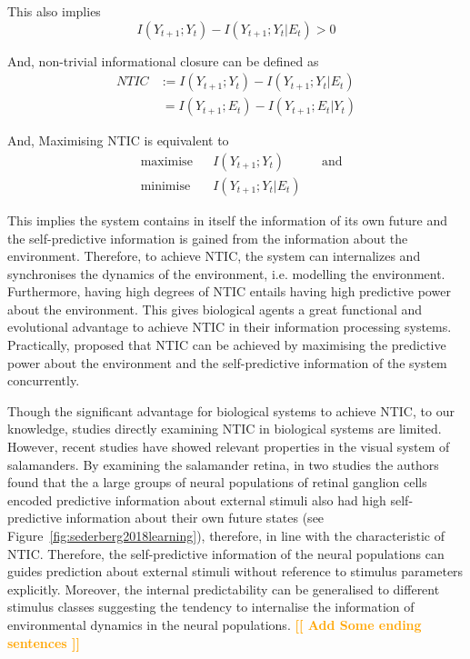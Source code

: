 \documentclass[utf8]{article}
\newcommand{\toWrite}[1]{\noindent
			\textcolor{Orange}{\textbf{[[ #1 ]]}}}
\begin{document}
			\noindent
			This also implies
				\begin{equation}
					I(Y_{t+1};Y_{t})-I(Y_{t+1};Y_{t}|E_{t}) > 0
				\end{equation}



			\noindent
			And, non-trivial informational closure can be defined as
				\begin{equation}
				\left.\begin{array}
				{rl}{NTIC} & {:=I(Y_{t+1};Y_{t})-I(Y_{t+1};Y_{t}|E_{t})}\\
				{ } & {\ =I(Y_{t+1};E_{t})-I(Y_{t+1};E_{t}|Y_{t})}
				\end{array} \right.
				\end{equation}


			\noindent
			And, Maximising NTIC is equivalent to
				\begin{equation}\label{eq:nticObjective}
				\begin{aligned}
				& \text{maximise} & { } & I(Y_{t+1};Y_{t}) & { } & \text{and} \\
				& \text{minimise} & { } & I(Y_{t+1};Y_{t}|E_{t}) & { }
				\end{aligned}
				\end{equation}

			\noindent
			This implies the system contains in itself the information of its own future and the self-predictive information is gained from the information about the environment. Therefore, to achieve NTIC, the system can internalizes and synchronises the dynamics of the environment, i.e. modelling the environment. Furthermore, having high degrees of NTIC entails having high predictive power about the environment. This gives biological agents a great functional and evolutional advantage to achieve NTIC in their information processing systems. Practically, \cite{guttenberg2016neural} proposed that NTIC can be achieved by maximising the predictive power about the environment and the self-predictive information of the system concurrently.


			Though the significant advantage for biological systems to achieve NTIC, to our knowledge, studies directly examining NTIC in biological systems are limited. However,  recent studies have showed relevant properties in the visual system of salamanders. By examining the salamander retina, in two studies \citep{Palmer2015, sederberg2018learning} the authors found that the a large groups of neural populations of retinal ganglion cells encoded predictive information about external stimuli also had high self-predictive information about their own future states (see Figure~\ref{fig:sederberg2018learning}), therefore, in line with the characteristic of NTIC. Therefore, the self-predictive information of the neural populations can guides prediction about external stimuli without reference to stimulus parameters explicitly. Moreover, the internal predictability can be generalised to different stimulus classes suggesting the tendency to internalise the information of environmental dynamics in the neural populations. \toWrite{Add Some ending sentences}
\end{document}
